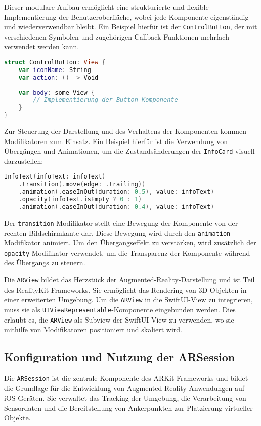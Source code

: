 Dieser modulare Aufbau ermöglicht eine strukturierte und flexible Implementierung der Benutzeroberfläche, wobei jede Komponente eigenständig und wiederverwendbar bleibt. Ein Beispiel hierfür ist der \texttt{ControlButton}, der mit verschiedenen Symbolen und zugehörigen Callback-Funktionen mehrfach verwendet werden kann.

\begin{lstlisting}[language=Swift]
struct ControlButton: View {
    var iconName: String
    var action: () -> Void
        
    var body: some View {
        // Implementierung der Button-Komponente
    }
}
\end{lstlisting}

Zur Steuerung der Darstellung und des Verhaltens der Komponenten kommen Modifikatoren zum Einsatz. Ein Beispiel hierfür ist die Verwendung von Übergängen und Animationen, um die Zustandsänderungen der \texttt{InfoCard} visuell darzustellen:

\begin{lstlisting}[language=Swift]
InfoText(infoText: infoText)
    .transition(.move(edge: .trailing))
    .animation(.easeInOut(duration: 0.5), value: infoText)
    .opacity(infoText.isEmpty ? 0 : 1)
    .animation(.easeInOut(duration: 0.4), value: infoText)
\end{lstlisting}

Der \texttt{transition}-Modifikator stellt eine Bewegung der Komponente von der rechten Bildschirmkante dar. Diese Bewegung wird durch den \texttt{animation}-Modifikator animiert. Um den Übergangseffekt zu verstärken, wird zusätzlich der \texttt{opacity}-Modifikator verwendet, um die Transparenz der Komponente während des Übergangs zu steuern.

Die \texttt{ARView} bildet das Herzstück der Augmented-Reality-Darstellung und ist Teil des RealityKit-Frameworks. Sie ermöglicht das Rendering von 3D-Objekten in einer erweiterten Umgebung. Um die \texttt{ARView} in die SwiftUI-View zu integrieren, muss sie als \texttt{UIViewRepresentable}-Komponente eingebunden werden. Dies erlaubt es, die \texttt{ARView} als Subview der SwiftUI-View zu verwenden, wo sie mithilfe von Modifikatoren positioniert und skaliert wird.

\subsection{Konfiguration und Nutzung der ARSession}

Die \texttt{ARSession} ist die zentrale Komponente des ARKit-Frameworks und bildet die Grundlage für die Entwicklung von Augmented-Reality-Anwendungen auf iOS-Geräten. Sie verwaltet das Tracking der Umgebung, die Verarbeitung von Sensordaten und die Bereitstellung von Ankerpunkten zur Platzierung virtueller Objekte. \cite{appledevdoc}

